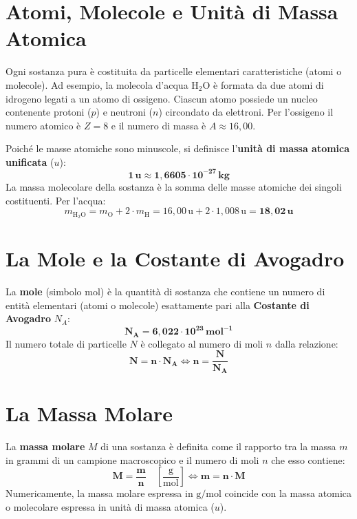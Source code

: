 \documentclass[11pt,a4paper,oneside]{report}
\begin{document}
\section{Atomi, Molecole e Unit\`a di Massa Atomica}

Ogni sostanza pura \`e costituita da particelle elementari caratteristiche (atomi o molecole). Ad esempio, la molecola d'acqua $\text{H}_2\text{O}$ \`e formata da due atomi di idrogeno legati a un atomo di ossigeno. Ciascun atomo possiede un nucleo contenente protoni ($p$) e neutroni ($n$) circondato da elettroni. Per l'ossigeno il numero atomico \`e $Z = 8$ e il numero di massa \`e $A \approx 16{,}00$.

Poich\'e le masse atomiche sono minuscole, si definisce l'\textbf{unit\`a di massa atomica unificata} ($u$):
\[
\mathbf{1\,\text{u} \approx 1{,}6605 \cdot 10^{-27}\,\text{kg}}
\]
La massa molecolare della sostanza \`e la somma delle masse atomiche dei singoli costituenti. Per l'acqua:
\[
m_{\text{H}_2\text{O}} = m_{\text{O}} + 2 \cdot m_{\text{H}} = 16{,}00\,\text{u} + 2 \cdot 1{,}008\,\text{u} = \mathbf{18{,}02\,\text{u}}
\]

\section{La Mole e la Costante di Avogadro}

\begin{leggefisica}
La \textbf{mole} (simbolo $\text{mol}$) \`e la quantit\`a di sostanza che contiene un numero di entit\`a elementari (atomi o molecole) esattamente pari alla \textbf{Costante di Avogadro} $N_A$:
\[
\mathbf{N_A = 6{,}022 \cdot 10^{23}\,\text{mol}^{-1}}
\]
Il numero totale di particelle $N$ \`e collegato al numero di moli $n$ dalla relazione:
\[
\mathbf{N = n \cdot N_A} \iff \mathbf{n = \frac{N}{N_A}}
\]
\end{leggefisica}

\section{La Massa Molare}

La \textbf{massa molare} $M$ di una sostanza \`e definita come il rapporto tra la massa $m$ in grammi di un campione macroscopico e il numero di moli $n$ che esso contiene:
\[
\mathbf{M = \frac{m}{n}} \quad \left[\frac{\text{g}}{\text{mol}}\right] \iff \mathbf{m = n \cdot M}
\]
Numericamente, la massa molare espressa in $\text{g/mol}$ coincide con la massa atomica o molecolare espressa in unit\`a di massa atomica ($u$).
\end{document}
